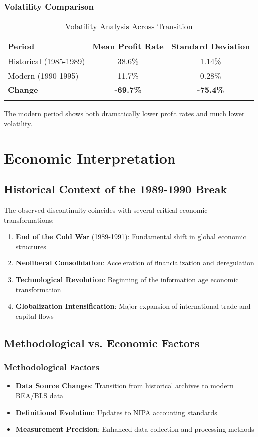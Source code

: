 \documentclass[12pt]{article}
\begin{document}
\subsubsection{Volatility Comparison}
\begin{longtable}{lcc}
\toprule
\textbf{Period} & \textbf{Mean Profit Rate} & \textbf{Standard Deviation} \\
\midrule
Historical (1985-1989) & 38.6\% & 1.14\% \\
Modern (1990-1995) & 11.7\% & 0.28\% \\
\textbf{Change} & \textbf{-69.7\%} & \textbf{-75.4\%} \\
\bottomrule
\caption{Volatility Analysis Across Transition}
\label{tab:volatility}
\end{longtable}

The modern period shows both dramatically lower profit rates and much lower volatility.

\section{Economic Interpretation}

\subsection{Historical Context of the 1989-1990 Break}

The observed discontinuity coincides with several critical economic transformations:

\begin{enumerate}
    \item \textbf{End of the Cold War} (1989-1991): Fundamental shift in global economic structures
    \item \textbf{Neoliberal Consolidation}: Acceleration of financialization and deregulation
    \item \textbf{Technological Revolution}: Beginning of the information age economic transformation
    \item \textbf{Globalization Intensification}: Major expansion of international trade and capital flows
\end{enumerate}

\subsection{Methodological vs. Economic Factors}

\subsubsection{Methodological Factors}
\begin{itemize}
    \item \textbf{Data Source Changes}: Transition from historical archives to modern BEA/BLS data
    \item \textbf{Definitional Evolution}: Updates to NIPA accounting standards
    \item \textbf{Measurement Precision}: Enhanced data collection and processing methods
\end{itemize}
\end{document}
